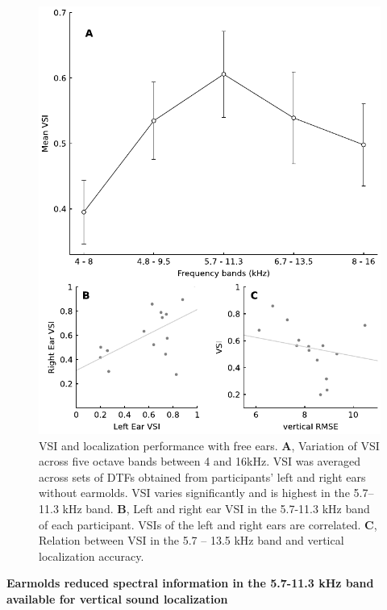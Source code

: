 \begin{figure}[h]
\begin{minipage}[t]{ \columnwidth}
	\includegraphics[width= \linewidth]{../Results/figures/fig2/fig2}
	\caption{VSI and localization performance with free ears. \textbf{A}, Variation of VSI across five octave bands between 4 and 16kHz. VSI was averaged across sets of DTFs obtained from participants' left and right ears without earmolds. VSI varies significantly and is highest in the 5.7–11.3 kHz band.  \textbf{B}, Left and right ear VSI in the 5.7-11.3 kHz band of each participant. VSIs of the left and right ears are correlated. \textbf{C}, Relation between VSI in the 5.7 – 13.5 kHz band and vertical localization accuracy.}
        \label{fig:second}
\end{minipage}
\end{figure}


\noindent \textbf{Earmolds reduced spectral information in the 5.7-11.3 kHz band available for vertical sound localization}\\

